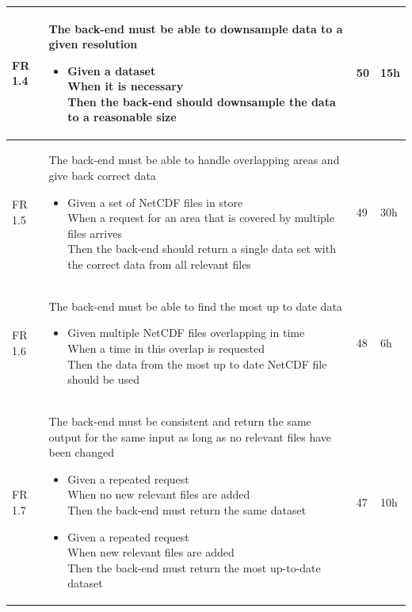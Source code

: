 \documentclass[11pt,a4paper,titlepage,oneside]{report}
\begin{document}
\begin{longtable}{p{1.4cm} p{7.8cm} p{1cm} p{1cm} }
  FR 1.4 & The back-end must be able to downsample data to a given resolution 
  \begin{itemize}
  \item \parbox[t]{6.8cm}{
        Given a dataset \\ 
        When it is necessary \\ 
        Then the back-end should downsample the data to a reasonable size}
  \end{itemize}
  & 50 & 15h \\ \hline

  FR 1.5 & The back-end must be able to handle overlapping areas and give back correct data
  \begin{itemize}
  \item \parbox[t]{6.8cm}{
        Given a set of NetCDF files in store \\
        When a request for an area that is covered by multiple files arrives \\
        Then the back-end should return a single data set with the correct data from all relevant files}
  \end{itemize}
  & 49 & 30h \\ \hline

  FR 1.6 & The back-end must be able to find the most up to date data
  \begin{itemize}
  \item \parbox[t]{6.8cm}{
        Given multiple NetCDF files overlapping in time \\
        When a time in this overlap is requested \\
        Then the data from the most up to date NetCDF file should be used}
  \end{itemize}
  & 48 & 6h \\ \hline

  FR 1.7 & The back-end must be consistent and return the same output for the same input as long as no relevant files have been changed
  \begin{itemize}
  \item \parbox[t]{6.8cm}{
        Given a repeated request \\
        When no new relevant files are added \\
        Then the back-end must return the same dataset}
  \item \parbox[t]{6.8cm}{
        Given a repeated request \\
        When new relevant files are added \\
        Then the back-end must return the most up-to-date dataset}
  \end{itemize}
  & 47 & 10h \\ \hline


\end{longtable}
\end{document}
